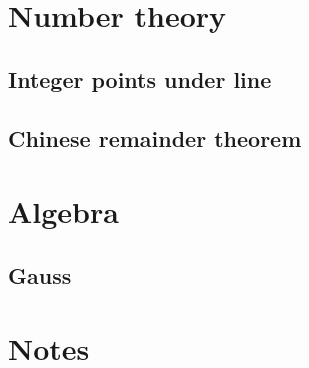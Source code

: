 \section{Number theory}
\subsection{Integer points under line}
\raggedbottom
\hrulefill
\subsection{Chinese remainder theorem}
\raggedbottom
\hrulefill

\section{Algebra}
\subsection{Gauss}
\raggedbottom
\hrulefill

\section{Notes}
